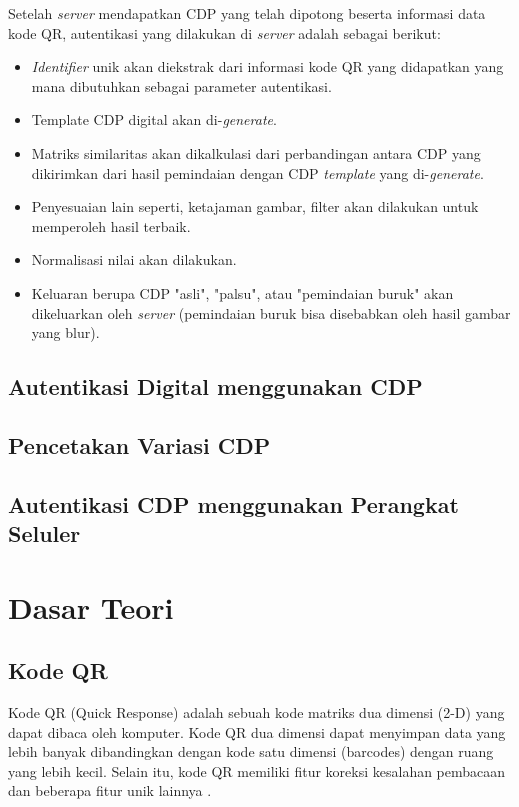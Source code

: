 Setelah \emph{server} mendapatkan CDP yang telah dipotong beserta informasi data kode QR, autentikasi yang dilakukan di \emph{server} adalah sebagai berikut:

\begin{itemize}
	\item \emph{Identifier} unik akan diekstrak dari informasi kode QR yang didapatkan yang mana dibutuhkan sebagai parameter autentikasi.
	\item Template CDP digital akan di-\emph{generate}.
	\item Matriks similaritas akan dikalkulasi dari perbandingan antara CDP yang dikirimkan dari hasil pemindaian dengan CDP \emph{template} yang di-\emph{generate}.
	\item Penyesuaian lain seperti, ketajaman gambar, filter akan dilakukan untuk memperoleh hasil terbaik.
	\item Normalisasi nilai akan dilakukan.
	\item Keluaran berupa CDP "asli", "palsu", atau "pemindaian buruk" akan dikeluarkan oleh \emph{server} (pemindaian buruk bisa disebabkan oleh hasil gambar yang
	      blur).
\end{itemize}

\subsection{Autentikasi Digital menggunakan CDP}

\subsection{Pencetakan Variasi CDP}

\subsection{Autentikasi CDP menggunakan Perangkat Seluler}

\section{Dasar Teori}

\subsection{Kode QR}

Kode QR (Quick Response) adalah sebuah kode matriks dua dimensi (2-D) yang dapat dibaca oleh komputer. Kode QR dua dimensi dapat menyimpan data yang lebih
banyak dibandingkan dengan kode satu dimensi (barcodes) dengan ruang yang lebih kecil. Selain itu, kode QR memiliki fitur koreksi kesalahan pembacaan dan
beberapa fitur unik lainnya \cite{densoqrcode}.

